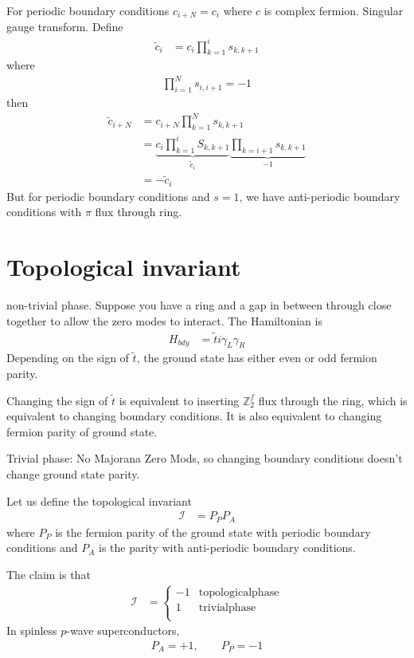 \begin{example}
    For periodic boundary conditions $c_{i + N} = c_i$
    where $c$ is complex fermion.
    Singular gauge transform.
    Define
    \begin{align}
        \tilde{c}_i &=
        c_i \prod_{k=1}^{i} s_{k,k+1}
    \end{align}
    where
    \begin{align}
        \prod_{i=1}^{N} s_{i,i+1} = -1
    \end{align}
    then
    \begin{align}
        \tilde{c}_{i+N} &=
        c_{i + N} \prod_{k=1}^{N} s_{k, k+1}\\
        &=
        \underbrace{c_i \prod_{k = 1}^{i} S_{k, k + 1}}_{\tilde{c}_i}
        \underbrace{\prod_{k=i + 1} s_{k, k + 1}}_{-1}\\
        &=
        - \tilde{c}_i
    \end{align}
    But for periodic boundary conditions and $s=1$,
    we have anti-periodic boundary conditions with $\pi$ flux through ring.
\end{example}

\section{Topological invariant}
non-trivial phase.
Suppose you have a ring and a gap in between through close together to allow the
zero modes to interact.
The Hamiltonian is
\begin{align}
    H_{bdy} &= \tilde{t} i \gamma_{L}\gamma_{R}
\end{align} 
Depending on the sign of $\tilde{t}$,
the ground state has either even or odd fermion parity.

Changing the sign of $\tilde{t}$ is equivalent to
inserting $\mathbb{Z}_2^f$ flux through the ring,
which is equivalent to changing boundary conditions.
It is also equivalent to changing fermion parity of ground state.

Trivial phase:
No Majorana Zero Mods,
so changing boundary conditions
doesn't change ground state parity.

Let us define the topological invariant
\begin{align}
    \mathcal{I} &=
    P_P P_A
\end{align}
where $P_P$ is the fermion parity of the ground state with periodic boundary
conditions and $P_A$ is the parity with anti-periodic boundary conditions.

The claim is that
\begin{align}
    \mathcal{I} &=
    \begin{cases}
        -1 & \mathrm{topological phase}\\
        1 & \mathrm{trivial phase}\\
    \end{cases}
\end{align}
In spinless $p$-wave superconductors,
\begin{align}
    P_A = + 1, \qquad P_P = -1
\end{align}

